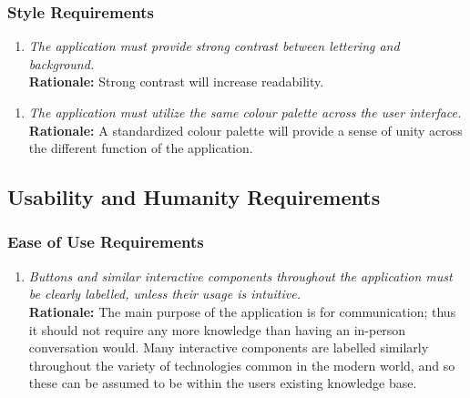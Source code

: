 \documentclass[]{article}
\begin{document}
\begin{enumerate}[{\bf BE1.}]
\subsubsection{Style Requirements}
\label{ssub:style_requirements}
\begin{enumerate}[{LF-S}1. ]
    \item \emph{The application must provide strong contrast between lettering and background.} \\
        {\bf Rationale:} Strong contrast will increase readability.
\end{enumerate}
\begin{enumerate}[{LF-S}2. ]
        \item \emph{The application must utilize the same colour palette across the user interface.} \\
        {\bf Rationale:} A standardized colour palette will provide a sense of unity across the different function of the application.
\end{enumerate}








\subsection{Usability and Humanity Requirements}
\label{sub:usability_and_humanity_requirements}


\subsubsection{Ease of Use Requirements}
\label{ssub:ease_of_use_requirements}
\begin{enumerate}[{UH-EOU}1. ]
    \item \emph{Buttons and similar interactive components throughout the application must be clearly labelled, unless their usage is intuitive.} \\
    {\bf Rationale:} The main purpose of the application is for communication; thus it should not require any more knowledge than having an in-person conversation would. Many interactive components are labelled similarly throughout the variety of technologies common in the modern world, and so these can be assumed to be within the users existing knowledge base.
\end{enumerate}



\end{enumerate}
\end{document}
